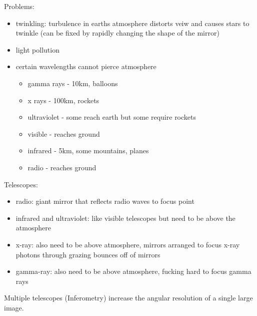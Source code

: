 Problems:
\begin{itemize}
\item twinkling: turbulence in earths atmosphere distorts veiw and causes stars to twinkle (can be fixed by rapidly changing the shape of the mirror)
\item light pollution
\item certain wavelengths cannot pierce atmosphere
\begin{itemize}
\item gamma rays - 10km, balloons
\item x rays - 100km, rockets
\item ultraviolet - some reach earth but some require rockets
\item visible - reaches ground
\item infrared - 5km, some mountains, planes
\item radio - reaches ground
\end{itemize}
\end{itemize}

Telescopes:
\begin{itemize}
\item radio: giant mirror that reflects radio waves to focus point
\item infrared and ultraviolet: like visible telescopes but need to be above the atmosphere
\item x-ray: also need to be above atmosphere, mirrors arranged to focus x-ray photons through grazing bounces off of mirrors
\item gamma-ray: also need to be above atmosphere, fucking hard to focus gamma rays
\end{itemize}

Multiple telescopes (Inferometry) increase the angular resolution of a single large image.

